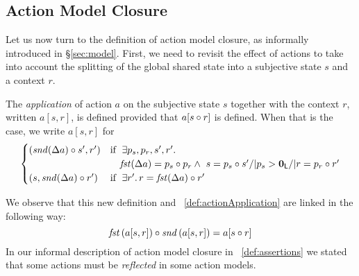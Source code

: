\subsection{Action Model Closure}
Let us now turn to the definition of action model closure, as informally introduced in \S\ref{sec:model}. First, we need to revisit the effect of actions to take into account the splitting of the global shared state into a subjective state $s$ and a context $r$.
%
%
\begin{definition}\label{def:actionApplicationPair}
The \emph{application} of action $a$ on the subjective state $s$ together with the context $r$, written $a[s,r]$, is defined provided that $a[s \circ r]$ is defined.
When that is the case, we write $a[s,r]$ for
%
\[
\begin{cases}
	\left(\mathit{snd}(\Delta {a})\circ s',r'\right) &
	\text{if }\;\exists p_s, p_r, s', r'.\, \\
	&	\quad \mathit{fst}(\Delta {a}) = p_s\circ p_r \land\ s = p_s \circ s' /|   p_s > \mathbf{0}_{\mathsf{L}} /| r = p_r \circ r' \\
		
	\left(s, \mathit{snd}(\Delta {a})\circ r'\right) & 
	\text{if }\;\exists r'.\, r = \mathit{fst}(\Delta {a}) \circ r' 
\end{cases}
\]
%
\end{definition}
%
%
\noindent We observe that this new definition and ~\ref{def:actionApplication} are linked in the following way: 
%
\[
	\mathit{fst}\left(a[s, r]\right) \circ \mathit{snd}\left(a[s, r]\right) = a[s\circ r]
\]
%
In our informal description of action model closure in ~\ref{def:assertions} we stated that some actions must be \emph{reflected} in some action models. 
